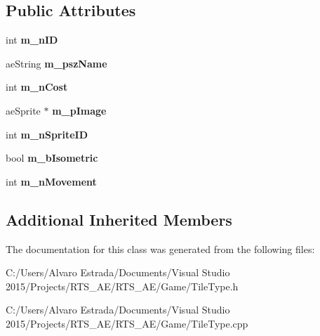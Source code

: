 \subsection*{Public Attributes}
\begin{DoxyCompactItemize}
\item 
int {\bfseries m\+\_\+n\+ID}\hypertarget{classae_tile_type_acfaf4ff6be3b428fd6874bc243900564}{}\label{classae_tile_type_acfaf4ff6be3b428fd6874bc243900564}

\item 
ae\+String {\bfseries m\+\_\+psz\+Name}\hypertarget{classae_tile_type_a11c7de6ca5c8d9f85f47157b3a8dad5c}{}\label{classae_tile_type_a11c7de6ca5c8d9f85f47157b3a8dad5c}

\item 
int {\bfseries m\+\_\+n\+Cost}\hypertarget{classae_tile_type_abd0818de5b6b1671d80b03b22f2954fe}{}\label{classae_tile_type_abd0818de5b6b1671d80b03b22f2954fe}

\item 
ae\+Sprite $\ast$ {\bfseries m\+\_\+p\+Image}\hypertarget{classae_tile_type_a77d769c4f2cf197eeabc0171d97a4788}{}\label{classae_tile_type_a77d769c4f2cf197eeabc0171d97a4788}

\item 
int {\bfseries m\+\_\+n\+Sprite\+ID}\hypertarget{classae_tile_type_a1cd89c50b538253f21d33d857aede022}{}\label{classae_tile_type_a1cd89c50b538253f21d33d857aede022}

\item 
bool {\bfseries m\+\_\+b\+Isometric}\hypertarget{classae_tile_type_ac2123be395c87bb58d44ab7109e28738}{}\label{classae_tile_type_ac2123be395c87bb58d44ab7109e28738}

\item 
int {\bfseries m\+\_\+n\+Movement}\hypertarget{classae_tile_type_a43b3dc7d3edd3cbcfba71f9a89cc3896}{}\label{classae_tile_type_a43b3dc7d3edd3cbcfba71f9a89cc3896}

\end{DoxyCompactItemize}
\subsection*{Additional Inherited Members}


The documentation for this class was generated from the following files\+:\begin{DoxyCompactItemize}
\item 
C\+:/\+Users/\+Alvaro Estrada/\+Documents/\+Visual Studio 2015/\+Projects/\+R\+T\+S\+\_\+\+A\+E/\+R\+T\+S\+\_\+\+A\+E/\+Game/Tile\+Type.\+h\item 
C\+:/\+Users/\+Alvaro Estrada/\+Documents/\+Visual Studio 2015/\+Projects/\+R\+T\+S\+\_\+\+A\+E/\+R\+T\+S\+\_\+\+A\+E/\+Game/Tile\+Type.\+cpp\end{DoxyCompactItemize}
